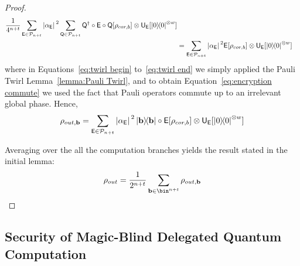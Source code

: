 \begin{proof}
\begin{align}
                \dfrac{1}{4^{n+t}}\sum_{\mathsf{E}\in \mathcal{P}_{n+t}}
                \abs*{\alpha_{\mathsf{E}}}^2
                \sum_{\mathsf Q \in \mathcal{P}_{n+t}}
                \mathsf Q^\dagger
                \circ
                \mathsf{E}
                \circ
                \mathsf Q[\rho_{cor, b}]
                \otimes \mathsf{U}_{\mathsf{E}}[
                    \ketbra0^{\otimes w}
                ]
                \\
                \label{eq:encryption commute}
                &=
                \sum_{\mathsf{E}\in \mathcal{P}_{n+t}}
                \abs*{\alpha_{\mathsf{E}}}^2
                \mathsf{E}
                [\rho_{cor, b}]
                \otimes \mathsf{U}_{\mathsf{E}}[
                    \ketbra0^{\otimes w}
                ]
        \end{align}
        where in Equations~\ref{eq:twirl begin} to~\ref{eq:twirl end} we simply applied the Pauli Twirl Lemma~\ref{lemma:Pauli Twirl}, and to obtain Equation~\ref{eq:encryption commute} we used the fact that Pauli operators commute up to an irrelevant global phase.
        Hence,
        \begin{equation}
            \rho_{out, \b} =
            \sum_{\E\in \Pauli_{n+t}}
            \abs*{\alpha_\E}^2
            \ketbra \b
            \circ
            \E
            [\rho_{cor, b}]
            \otimes \U_\E[
                \ketbra0^{\otimes w}
            ]
        \end{equation}

        Averaging over the all the computation branches yields the result stated in the initial lemma:
        \begin{align}
            \rho_{out}
        =
            \dfrac{1}{2^{n+t}}
            \sum_{\b\in\bin^{n+t}}
            \rho_{out, \b}
        \end{align}

\end{proof}
 \subsection{Security of Magic-Blind Delegated Quantum Computation}
\label{subsection:security proof MB-DQC}

